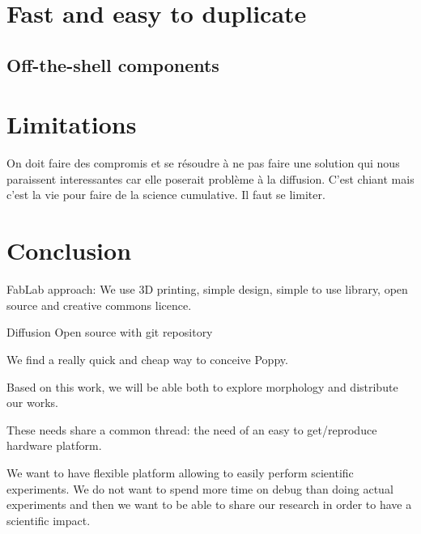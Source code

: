 \section{Fast and easy to duplicate} %

\subsection{Off-the-shell components} %


\section{Limitations} %

On doit faire des compromis et se résoudre à ne pas faire une solution qui  nous paraissent interessantes car elle poserait problème à la diffusion. C'est chiant mais c'est la vie pour faire de la science cumulative. Il faut se limiter.


\section{Conclusion} %

FabLab approach: We use 3D printing, simple design, simple to use library, open source and creative commons licence.

Diffusion Open source with git repository

We find a really quick and cheap way to conceive Poppy.

Based on this work, we will be able both to explore morphology and distribute our works.

These needs share a common thread: the need of an easy to get/reproduce hardware platform.

We want to have flexible platform allowing to easily perform scientific experiments. We do not want to spend more time on debug than doing actual experiments and then we want to be able to share our research in order to have a scientific impact.



